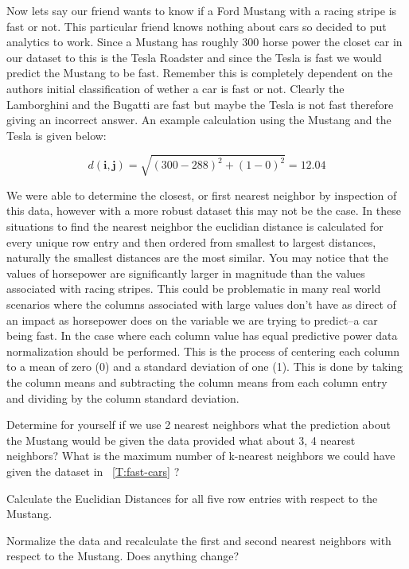 Now lets say our friend wants to know if a Ford Mustang with a racing
stripe is fast or not. This particular friend knows nothing about cars
so decided to put analytics to work. Since a Mustang has roughly 300
horse power the closet car in our dataset to this is the Tesla
Roadster and since the Tesla is fast we would predict the Mustang to
be fast. Remember this is completely dependent on the authors initial
classification of wether a car is fast or not. Clearly the Lamborghini
and the Bugatti are fast but maybe the Tesla is not fast therefore
giving an incorrect answer. An example calculation using the Mustang
and the Tesla is given below: 

\[{d(\mathbf{i},\mathbf{j})}  =
\sqrt{{(300 - 288)^2 + (1 - 0)^2 } }  = 12.04\]

We were able to determine the closest, or first nearest neighbor by
inspection of this data, however with a more robust dataset this may
not be the case. In these situations to find the nearest neighbor the
euclidian distance is calculated for every unique row entry and then
ordered from smallest to largest distances, naturally the smallest
distances are the most similar. You may notice that the values of
horsepower are significantly larger in magnitude than the values
associated with racing stripes. This could be problematic in many real
world scenarios where the columns associated with large values don't
have as direct of an impact as horsepower does on the variable we are
trying to predict--a car being fast. In the case where
each column value has equal predictive power data normalization should
be performed. This is the process of centering each column to a mean
of zero (0) and a standard deviation of one (1). This is done by taking the column
means and subtracting the column means from each column entry and
dividing by the column standard deviation. 

\begin{exercise} Determine for yourself if we use 2 nearest neighbors what the
prediction about the Mustang would be given the data provided what
about 3, 4  nearest neighbors? What is the maximum number of k-nearest
neighbors we could have given the dataset in ~\ref{T:fast-cars} ?
\end{exercise}

\begin{exercise} Calculate the Euclidian Distances for all five row
  entries with respect to the Mustang.
\end{exercise}

\begin{exercise} Normalize the data and recalculate the first and
  second nearest neighbors with respect to the Mustang. Does anything
  change? 
\end{exercise}

